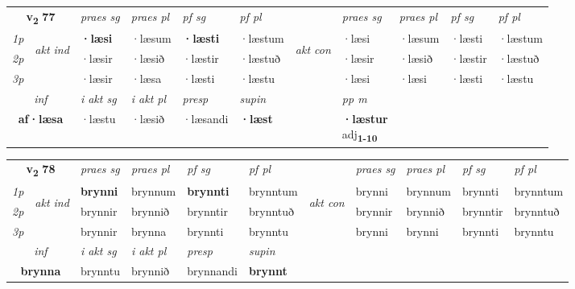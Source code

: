 \noindent
\begin{tabular}{lllllllllll} \toprule
\multicolumn{2}{c}{\textbf{v{\textsubscript{2}}} \Large{\textbf{77}}}  &  \textit{praes sg}  & \textit{praes pl}  &\textit{ pf sg} & \textit{pf pl} &  &  \textit{praes sg}  & \textit{praes pl}  & \textit{pf sg} & \textit{pf pl } \\*
	\cmidrule{3-6} \cmidrule{8-11}
 {\textit{1p}} & \multirow{3}{*}{\begin{turn}{90}\textit{akt ind}\end{turn}} & \textbf{·læsi} & ·læsum & \textbf{·læsti} & ·læstum & \multirow{3}{*}{\begin{turn}{90}\textit{akt con}\end{turn}} &·læsi & ·læsum & ·læsti & ·læstum\\*
 {\textit{2p}} &  &  ·læsir  & ·læsið & ·læstir & ·læstuð & & ·læsir & ·læsið & ·læstir & ·læstuð \\*
{\textit{3p}} &  & ·læsir & ·læsa & ·læsti & ·læstu & & ·læsi & ·læsi& ·læsti & ·læstu \\*
\cmidrule{3-6} \cmidrule{8-11}

   \multicolumn{2}{c}{\textit{inf}}  & \textit{i akt sg} & \textit{i akt pl}   & \textit{presp} & \textit{supin}  && \textit{pp m} \\*
  \multicolumn{2}{c}{\textbf{af\allowbreak ·læsa}} & ·læstu  & ·læsið   & ·læsandi &  \textbf{·læst}  && \specialcell{\textbf{·læstur} \\ adj\textbf{\textsubscript{1-10}}} \\*
\end{tabular}

\noindent
\begin{tabular}{lllllllllll} \toprule
\multicolumn{2}{c}{\textbf{v{\textsubscript{2}}} \Large{\textbf{78}}}  &  \textit{praes sg}  & \textit{praes pl}  &\textit{ pf sg} & \textit{pf pl} &  &  \textit{praes sg}  & \textit{praes pl}  & \textit{pf sg} & \textit{pf pl } \\*
	\cmidrule{3-6} \cmidrule{8-11}
 {\textit{1p}} & \multirow{3}{*}{\begin{turn}{90}\textit{akt ind}\end{turn}} & \textbf{brynni} & brynnum & \textbf{brynnti} & brynntum & \multirow{3}{*}{\begin{turn}{90}\textit{akt con}\end{turn}} &brynni & brynnum & brynnti & brynntum\\*
 {\textit{2p}} &  &  brynnir  & brynnið & brynntir & brynntuð & & brynnir & brynnið & brynntir & brynntuð \\*
{\textit{3p}} &  & brynnir & brynna & brynnti & brynntu & & brynni & brynni& brynnti & brynntu \\*
\cmidrule{3-6} \cmidrule{8-11}

   \multicolumn{2}{c}{\textit{inf}}  & \textit{i akt sg} & \textit{i akt pl}   & \textit{presp} & \textit{supin}   \\*
  \multicolumn{2}{c}{\textbf{brynna}} & brynntu  & brynnið   & brynnandi &  \textbf{brynnt}   \\*
\end{tabular}

